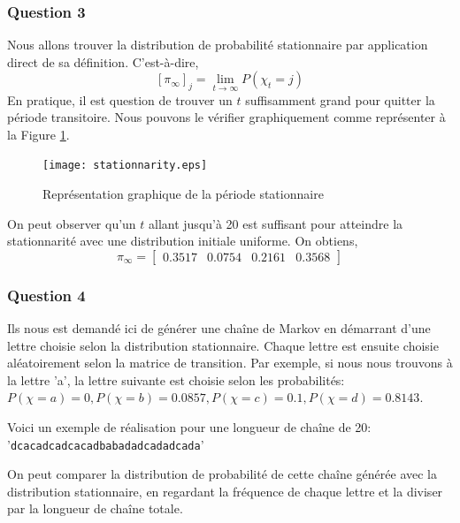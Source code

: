 \documentclass[12pt]{article}
\begin{document}
\subsubsection*{Question 3}
Nous allons trouver la distribution de probabilité stationnaire par application direct de sa définition. C'est-à-dire,
$$ [\pi_{\infty}]_j =  \lim_{t \rightarrow \infty} P(\chi_t = j)$$
En pratique, il est question de trouver un $t$ suffisamment grand pour quitter la période transitoire. Nous pouvons le vérifier graphiquement comme représenter à la Figure \ref{stationaryperiod}.


 \begin{figure}[!h]
      \centering
      \texttt{[image: stationnarity.eps]}
       \caption{Représentation graphique de la période stationnaire}
       \label{stationaryperiod}
  \end{figure}
On peut observer qu'un $t$ allant jusqu’à 20 est suffisant pour atteindre la stationnarité avec une distribution initiale uniforme. On obtiens,
$$ \pi_{\infty} =   \begin{bmatrix}
0.3517 & 0.0754 & 0.2161 & 0.3568
\end{bmatrix}$$
\subsubsection*{Question 4}
Ils nous est demandé ici de générer une chaîne de Markov en démarrant d'une lettre choisie selon la distribution stationnaire. Chaque lettre est ensuite choisie aléatoirement selon la matrice de transition. Par exemple, si nous nous trouvons à la lettre 'a', la lettre suivante est choisie selon les probabilités: $P(\chi = a) = 0, P(\chi = b) = 0.0857, P(\chi = c) = 0.1, P(\chi = d) = 0.8143$.

Voici un exemple de réalisation pour une longueur de chaîne de 20: '\texttt{dcacadcadcacadbabadadcadadcada}'

On peut comparer la distribution de probabilité de cette chaîne générée avec la distribution stationnaire, en regardant la fréquence de chaque lettre et la diviser par la longueur de chaîne totale.
\end{document}
